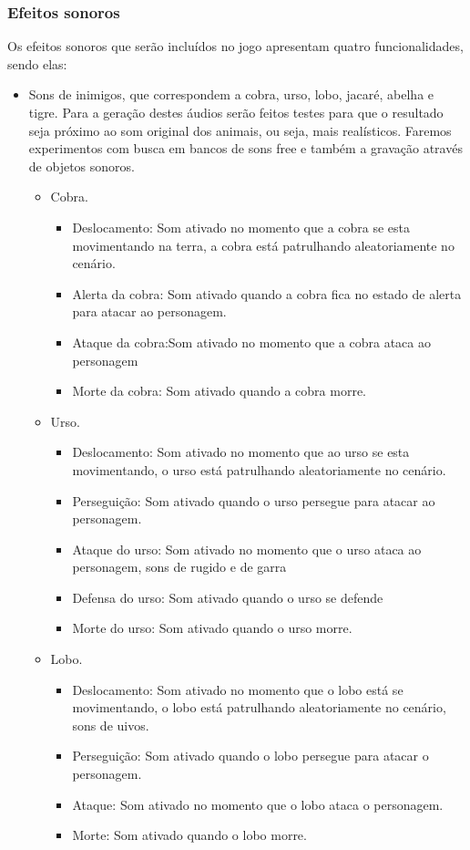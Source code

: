\subsubsection{Efeitos sonoros}
Os efeitos sonoros que serão incluídos no jogo apresentam quatro
 funcionalidades, sendo elas:
\begin{itemize}
\item Sons de inimigos, que correspondem a cobra, urso, lobo, jacaré, abelha
 e tigre. 
Para a geração destes áudios serão feitos testes para que o resultado 
seja próximo ao som original dos animais, ou seja, mais realísticos. 
Faremos experimentos com busca em bancos de sons free e também a 
gravação através de objetos sonoros. 

\begin{itemize}
\item Cobra.
\begin{itemize}
\item Deslocamento: Som ativado no momento que a cobra se esta 
movimentando na terra, a cobra está patrulhando aleatoriamente no cenário.
\item Alerta da cobra: Som ativado quando a cobra fica no estado de alerta 
para atacar ao personagem.
\item Ataque da cobra:Som ativado no momento que a cobra ataca 
ao personagem 
\item Morte da cobra: Som ativado quando a cobra morre. 
\end{itemize}

\item Urso.
\begin{itemize}
\item Deslocamento: Som ativado no momento que ao urso se esta movimentando, 
o urso está patrulhando aleatoriamente no cenário.
\item Perseguição: Som ativado quando o urso persegue para atacar ao personagem.
\item Ataque do urso: Som ativado no momento que o urso ataca ao personagem, 
sons de rugido e de garra
\item Defensa do urso: Som ativado quando o urso se defende  
\item Morte do urso: Som ativado quando o urso morre.
\end{itemize}

\item Lobo.
\begin{itemize}
\item Deslocamento: Som ativado no momento que o lobo está se movimentando,
o lobo está patrulhando aleatoriamente no cenário, sons de uivos.
\item Perseguição: Som ativado quando o lobo persegue para atacar o personagem.
\item Ataque: Som ativado no momento que o lobo ataca o personagem.
\item Morte: Som ativado quando o lobo morre.
\end{itemize}


\end{itemize}
\end{itemize}
